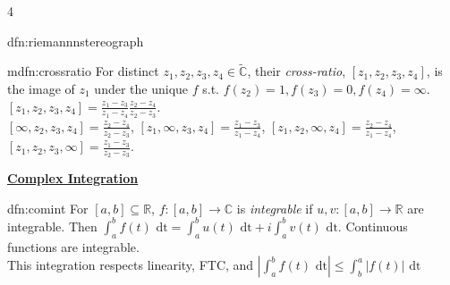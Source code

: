\documentclass[landscape, 8pt]{extarticle}
\begin{document}
\begin{multicols*}{4}
\begin{dfn}{dfn:riemannnstereograph}{ }
		
	\end{dfn}
	
	
	\begin{mdfn}{mdfn:crossratio}{ }
		For distinct $z_1, z_2, z_3, z_4 \in \tilde{\mathbb{C}}$, their \textit{cross-ratio}, $[z_1, z_2, z_3, z_4]$, is the image of $z_1$ under the unique $f$ s.t. $f(z_2) = 1, f(z_3) = 0, f(z_4) = \infty$.
		$[z_1, z_2, z_3, z_4] = \frac{z_1-z_3}{z_1 - z_4} \frac{z_2 - z_4}{z_2 - z_3}.$ \\
		$[\infty, z_2, z_3, z_4] = \frac{z_2-z_4}{z_2 - z_3}$,
		$[z_1, \infty, z_3, z_4] = \frac{z_1-z_3}{z_1 - z_4}$,
		$[z_1, z_2, \infty, z_4] = \frac{z_2-z_4}{z_1 - z_4}$,
		$[z_1, z_2, z_3, \infty] = \frac{z_1-z_3}{z_2 - z_3}$.
		
	\end{mdfn}
	
	
	
	{\footnotesize \textbf{\underline{Complex Integration}}}
	
	\begin{dfn}{dfn:comint}{ }
		For $[a, b] \subseteq \mathbb{R}$, $f: [a,b] \to \mathbb{C}$ is \textit{integrable} if $u, v : [a, b] \to \mathbb{R}$ are integrable. Then $\int_{a}^{b}f(t) \text{ dt} = \int_{a}^{b}u(t) \text{ dt} + i \int_{a}^{b} v(t) \text{ dt}$. Continuous functions are integrable. \\
		This integration respects linearity, FTC, and $\left|\int_{a}^{b} f(t) \text{ dt}\right| \le \int_{b}^{a} \left|f(t)\right| \text{ dt}$
		
	\end{dfn}
	

\end{multicols*}
\end{document}
